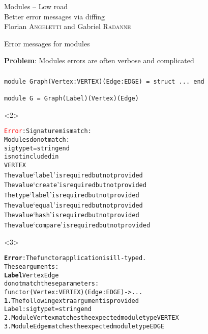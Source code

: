 \documentclass[aspectratio=169,dvipsnames,svgnames,10pt]{beamer}
\newcommand{\error}[1]{\textcolor{red}{#1}}
\begin{document}
\begin{frame}[t,standout]
  \centering
  \Huge Modules -- Low road\\
  \huge Better error messages via diffing\\
  \large Florian \textsc{Angeletti} and Gabriel \textsc{Radanne}
\end{frame}


\begin{frame}[fragile]{Error messages for modules}

  \textbf{Problem}: Modules errors are often verbose and complicated


\end{frame}

\begin{frame}[fragile,t]\frametitle{}

\begin{verbatim}
module Graph(Vertex:VERTEX)(Edge:EDGE) = struct ... end

module G = Graph(Label)(Vertex)(Edge)
\end{verbatim}
\begin{onlyenv}<2>
\begin{alltt}
\error{Error}: Signature mismatch:
       Modules do not match:
         sig type t = string end
       is not included in
         VERTEX
       The value `label' is required but not provided
       The value `create' is required but not provided
       The type `label' is required but not provided
       The value `equal' is required but not provided
       The value `hash' is required but not provided
       The value `compare' is required but not provided
\end{alltt}
\end{onlyenv}

\begin{onlyenv}<3>
\begin{alltt}
{\bfseries{}\color{red}{}Error}: The functor application is ill-typed.
       These arguments:
         {\color{red}{}\bfseries{}Label} {\color{green}{}Vertex} {\color{green}{}Edge}
       do not match these parameters:
         functor {\color{red}{}\bfseries{}} {\color{green}{}(Vertex : VERTEX)} {\color{green}{}(Edge : EDGE)} -> ...
  {\color{red}{}\bfseries{}1.} The following extra argument is provided
      Label : sig type t = string end
  {\color{green}{}2.} Module Vertex matches the expected module type VERTEX
  {\color{green}{}3.} Module Edge matches the expected module type EDGE
\end{alltt}
\end{onlyenv}

\end{frame}
\end{document}
